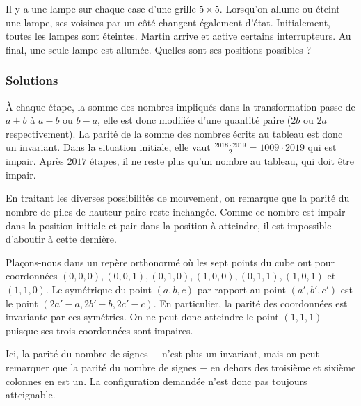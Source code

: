 \begin{exo}
Il y a une lampe sur chaque case d'une grille $5 \times 5$. Lorsqu'on allume ou éteint une lampe, ses voisines par un côté changent également d'état. Initialement, toutes les lampes sont éteintes. Martin arrive et active certains interrupteurs. Au final, une seule lampe est allumée. Quelles sont ses positions possibles ?
\end{exo}


\subsubsection{Solutions}


\begin{sol}
À chaque étape, la somme des nombres impliqués dans la transformation passe de $a+b$ à $a-b$ ou $b-a$, elle est donc modifiée d'une quantité paire ($2b$ ou $2a$ respectivement). La parité de la somme des nombres écrits au tableau est donc un invariant. Dans la situation initiale, elle vaut $\frac{2018\cdot 2019}2=1009\cdot 2019$ qui est impair. Après $2017$ étapes, il ne reste plus qu'un nombre au tableau, qui doit être impair.
\end{sol}


\begin{sol}
En traitant les diverses possibilités de mouvement, on remarque que la parité du nombre de piles de hauteur paire reste inchangée. Comme ce nombre est impair dans la position initiale et pair dans la position à atteindre, il est impossible d'aboutir à cette dernière.
\end{sol}


\begin{sol}
Plaçons-nous dans un repère orthonormé où les sept points du cube ont pour coordonnées $(0,0,0),(0,0,1),(0,1,0),(1,0,0),(0,1,1),(1,0,1)$ et $(1,1,0)$. Le symétrique du point $(a,b,c)$ par rapport au point $(a',b',c')$ est le point $(2a'-a,2b'-b,2c'-c)$. En particulier, la parité des coordonnées est invariante par ces symétries. On ne peut donc atteindre le point $(1,1,1)$ puisque ses trois coordonnées sont impaires.
\end{sol}


\begin{sol}
Ici, la parité du nombre de signes $-$ n'est plus un invariant, mais on peut remarquer que la parité du nombre de signes $-$ en dehors des troisième et sixième colonnes en est un. La configuration demandée n'est donc pas toujours atteignable.
\end{sol}


